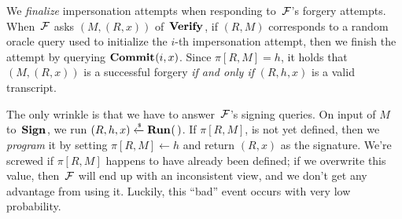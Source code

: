 \documentclass{article}
\theoremstyle{remark}
\begin{document}
We \emph{finalize} impersonation attempts when responding to~$\mathcal{F}$'s forgery
attempts. When~$\mathcal{F}$ asks $(M,(R,x))$ of~$\textup{\textbf{Verify}}\hspace{0.5pt}$, if $(R,M)$ corresponds to a
random oracle query used to initialize the $i$-th impersonation attempt, then we
finish the attempt by querying $\textup{\textbf{Commit}}\hspace{0.5pt}(i,x)$. Since $\pi[R,M]=h$, it holds
that $(M, (R,x))$ is a successful forgery \emph{if and only if} $(R,h,x)$ is a
valid transcript.

The only wrinkle is that we have to answer~$\mathcal{F}$'s signing queries. On input of
$M$ to~$\textup{\textbf{Sign}}\hspace{0.5pt}$, we run $(R, h, x)\xleftarrow{\text{\tiny{\$}}}\textup{\textbf{Run}}\hspace{0.5pt}(\,)$. If $\pi[R,M]$, is not yet
defined, then we \emph{program} it by setting $\pi[R,M]\gets h$ and return
$(R,x)$ as the signature.
%
We're screwed if $\pi[R,M]$ happens to have already been defined; if we
overwrite this value, then~$\mathcal{F}$ will end up with an inconsistent view, and we
don't get any advantage from using it.
%
Luckily, this ``bad'' event occurs with very low probability.
\end{document}
